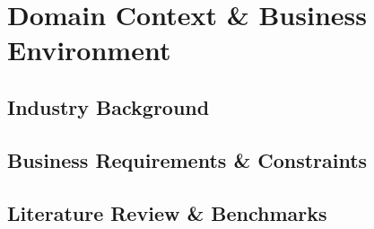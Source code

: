 \chapter{Domain Context \& Business Environment}
\label{chap:domain_context}

\section{Industry Background}

\section{Business Requirements \& Constraints}

\section{Literature Review \& Benchmarks}
